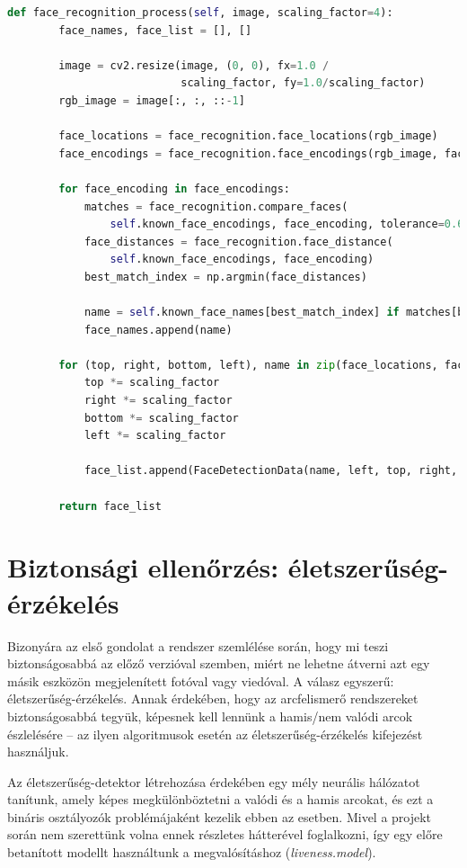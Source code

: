 \begin{lstlisting}[language=python]
def face_recognition_process(self, image, scaling_factor=4):
        face_names, face_list = [], []

        image = cv2.resize(image, (0, 0), fx=1.0 /
                           scaling_factor, fy=1.0/scaling_factor)
        rgb_image = image[:, :, ::-1]

        face_locations = face_recognition.face_locations(rgb_image)
        face_encodings = face_recognition.face_encodings(rgb_image, face_locations)

        for face_encoding in face_encodings:
            matches = face_recognition.compare_faces(
                self.known_face_encodings, face_encoding, tolerance=0.6)
            face_distances = face_recognition.face_distance(
                self.known_face_encodings, face_encoding)
            best_match_index = np.argmin(face_distances)

            name = self.known_face_names[best_match_index] if matches[best_match_index] else "Unknown"
            face_names.append(name)

        for (top, right, bottom, left), name in zip(face_locations, face_names):
            top *= scaling_factor
            right *= scaling_factor
            bottom *= scaling_factor
            left *= scaling_factor

            face_list.append(FaceDetectionData(name, left, top, right, bottom))

        return face_list
\end{lstlisting}

\section{Biztonsági ellenőrzés: életszerűség-érzékelés}

Bizonyára az első gondolat a rendszer szemlélése során, hogy mi teszi biztonságosabbá az előző verzióval szemben, miért ne lehetne átverni azt egy másik eszközön megjelenített fotóval vagy viedóval. A válasz egyszerű: életszerűség-érzékelés. 
Annak érdekében, hogy az arcfelismerő rendszereket biztonságosabbá tegyük, képesnek kell lennünk a hamis/nem valódi arcok észlelésére – az ilyen algoritmusok esetén az életszerűség-érzékelés kifejezést használjuk.

Az életszerűség-detektor létrehozása érdekében egy mély neurális hálózatot tanítunk, amely képes megkülönböztetni a valódi és a hamis arcokat, és ezt a bináris osztályozók problémájaként kezelik ebben az esetben. Mivel a projekt során nem szerettünk volna ennek részletes hátterével foglalkozni, így egy előre betanított modellt használtunk a megvalósításhoz (\textit{liveness.model}).

